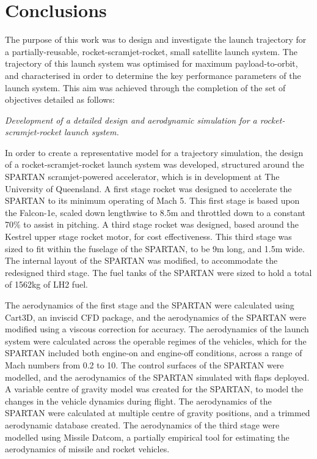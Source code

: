 
\cleardoublepage
\chapter{Conclusions}


The purpose of this work was to design and investigate the launch trajectory for a partially-reusable, rocket-scramjet-rocket, small satellite launch system. 
The trajectory of this launch system was optimised for maximum payload-to-orbit, and characterised in order to determine the key performance parameters of the launch system. 
This aim was achieved through the completion of the set of objectives detailed as follows:

\vspace{10pt}
	\emph{Development of a detailed design and aerodynamic simulation for a rocket-scramjet-rocket launch system.}
	
	In order to create a representative model for a trajectory simulation, the design of a rocket-scramjet-rocket launch system was developed, structured around the SPARTAN scramjet-powered accelerator, which is in development at The University of Queensland. A first stage rocket was designed to accelerate the SPARTAN to its minimum operating of Mach 5. This first stage is based upon the Falcon-1e, scaled down lengthwise to 8.5m and throttled down to a constant 70\% to assist in pitching.
	A third stage rocket was designed, based around the Kestrel upper stage rocket motor, for cost effectiveness. This third stage was sized to fit within the fuselage of the SPARTAN, to be 9m long, and 1.5m wide.   
The internal layout of the SPARTAN was modified, to accommodate the redesigned third stage. The fuel tanks of the SPARTAN were sized to hold a total of 1562kg of LH2 fuel. 

The aerodynamics of the first stage and the SPARTAN were calculated using Cart3D, an inviscid CFD package, and the aerodynamics of the SPARTAN were modified using a viscous correction for accuracy. The aerodynamics of the launch system were calculated across the operable regimes of the vehicles, which for the SPARTAN included both engine-on and engine-off conditions, across a range of Mach numbers from 0.2 to 10. The control surfaces of the SPARTAN were modelled, and the aerodynamics of the SPARTAN simulated with flaps deployed. A variable centre of gravity model was created for the SPARTAN, to model the changes in the vehicle dynamics during flight. The aerodynamics of the SPARTAN were calculated at multiple centre of gravity positions, and a trimmed aerodynamic database created. 
The aerodynamics of the third stage were modelled using Missile Datcom, a partially empirical tool for estimating the aerodynamics of missile and rocket vehicles. 

